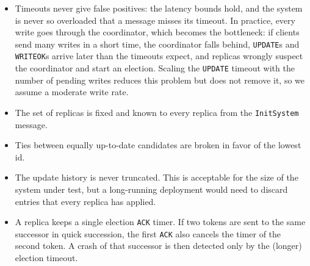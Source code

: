 \begin{itemize}[nosep]
    \item Timeouts never give false positives: the latency bounds hold, and the system is never so overloaded that a message misses its timeout. In practice, every write goes through the coordinator, which becomes the bottleneck: if clients send many writes in a short time, the coordinator falls behind, \texttt{UPDATE}s and \texttt{WRITEOK}s arrive later than the timeouts expect, and replicas wrongly suspect the coordinator and start an election. Scaling the \texttt{UPDATE} timeout with the number of pending writes reduces this problem but does not remove it, so we assume a moderate write rate.
    \item The set of replicas is fixed and known to every replica from the \texttt{InitSystem} message.
    \item Ties between equally up-to-date candidates are broken in favor of the lowest id.
    \item The update history is never truncated. This is acceptable for the size of the system under test, but a long-running deployment would need to discard entries that every replica has applied.
    \item A replica keeps a single election \texttt{ACK} timer. If two tokens are sent to the same successor in quick succession, the first \texttt{ACK} also cancels the timer of the second token. A crash of that successor is then detected only by the (longer) election timeout.
\end{itemize}


